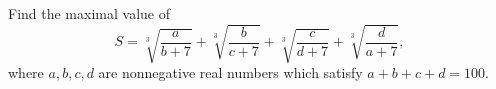 Find the maximal value of
\[ S = \sqrt[3]{\frac{a}{b+7}} + \sqrt[3]{\frac{b}{c+7}} + \sqrt[3]{\frac{c}{d+7}} + \sqrt[3]{\frac{d}{a+7}}, \]
where $a, b, c, d$ are nonnegative real numbers which satisfy $a + b + c + d = 100$.
